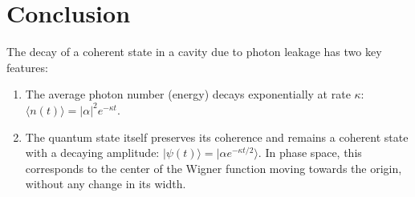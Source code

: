 \documentclass{article}
\begin{document}
\section{Conclusion}
The decay of a coherent state in a cavity due to photon leakage has two key features:
\begin{enumerate}
\item The average photon number (energy) decays exponentially at rate $\kappa$: $\langle n(t) \rangle = |\alpha|^2 e^{-\kappa t}$.
\item The quantum state itself preserves its coherence and remains a coherent state with a decaying amplitude: $|\psi(t)\rangle = | \alpha e^{-\kappa t / 2} \rangle$. In phase space, this corresponds to the center of the Wigner function moving towards the origin, without any change in its width.
\end{enumerate}
\end{document}
